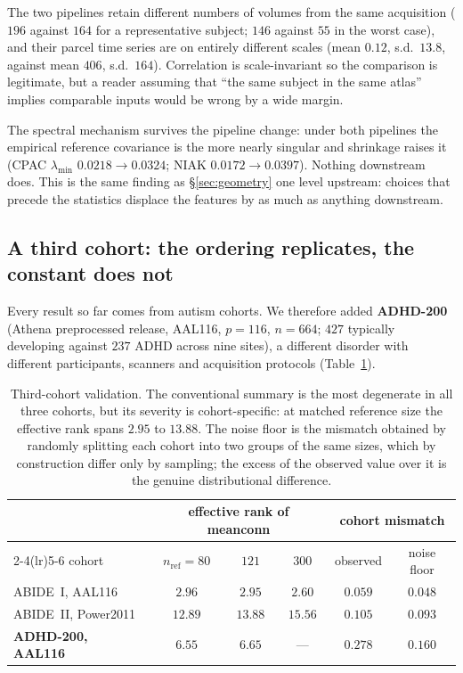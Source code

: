 \documentclass[11pt,a4paper]{article}
\newcommand{\ld}{\lambda_{\min}}
\begin{document}
\noindent
The two pipelines retain different numbers of volumes from the same
acquisition ($196$ against $164$ for a representative subject; $146$
against $55$ in the worst case), and their parcel time series are on
entirely different scales (mean $0.12$, s.d.\ $13.8$, against mean $406$,
s.d.\ $164$). Correlation is scale-invariant so the comparison is
legitimate, but a reader assuming that ``the same subject in the same
atlas'' implies comparable inputs would be wrong by a wide margin.

The spectral mechanism survives the pipeline change: under both pipelines
the empirical reference covariance is the more nearly singular and shrinkage
raises it (CPAC $\ld$ $0.0218\to0.0324$; NIAK $0.0172\to0.0397$). Nothing
downstream does. This is the same finding as \S\ref{sec:geometry} one level
upstream: choices that precede the statistics displace the features by as
much as anything downstream.

\subsection{A third cohort: the ordering replicates, the constant does not}
\label{sec:third}

Every result so far comes from autism cohorts. We therefore added
\textbf{ADHD-200} (Athena preprocessed release, AAL116, $p=116$,
$n=664$; $427$ typically developing against $237$ ADHD across nine sites),
a different disorder with different participants, scanners and acquisition
protocols (Table~\ref{tab:third}).

\begin{table}[htbp]
\centering
{\small\setlength{\tabcolsep}{6pt}
\begin{tabular}{lccccc}
\toprule
& \multicolumn{3}{c}{effective rank of meanconn}
& \multicolumn{2}{c}{cohort mismatch} \\
\cmidrule(lr){2-4}\cmidrule(lr){5-6}
cohort & $n_{\mathrm{ref}}{=}80$ & $121$ & $300$
 & observed & noise floor \\
\midrule
ABIDE~I, AAL116    & $2.96$ & $2.95$ & $2.60$ & $0.059$ & $0.048$ \\
ABIDE~II, Power2011& $12.89$& $13.88$& $15.56$& $0.105$ & $0.093$ \\
\textbf{ADHD-200, AAL116} & $6.55$ & $\mathbf{6.65}$ & --- & $\mathbf{0.278}$ & $\mathbf{0.160}$ \\
\bottomrule
\end{tabular}}
\caption{Third-cohort validation. The conventional summary is the most
degenerate in all three cohorts, but its severity is cohort-specific: at
matched reference size the effective rank spans $2.95$ to $13.88$. The noise
floor is the mismatch obtained by randomly splitting each cohort into two
groups of the same sizes, which by construction differ only by sampling; the
excess of the observed value over it is the genuine distributional
difference.}
\label{tab:third}
\end{table}
\end{document}
